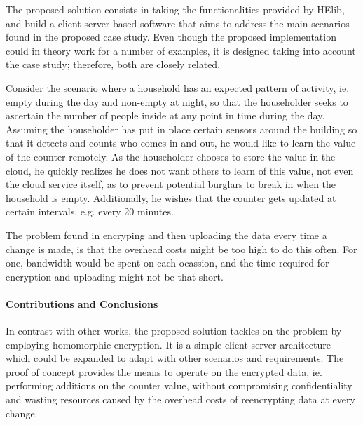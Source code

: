 The proposed solution consists in taking the functionalities provided by HElib, and build a client-server based software that aims to address the main scenarios found in the proposed case study. Even though the proposed implementation could in theory work for a number of examples, it is designed taking into account the case study; therefore, both are closely related.

Consider the scenario where a household has an expected pattern of activity, ie. empty during the day and non-empty at night, so that the householder seeks to ascertain the number of people inside at any point in time during the day. Assuming the householder has put in place certain sensors around the building so that it detects and counts who comes in and out, he would like to learn the value of the counter remotely. As the householder chooses to store the value in the cloud, he quickly realizes he does not want others to learn of this value, not even the cloud service itself, as to prevent potential burglars to break in when the household is empty. Additionally, he wishes that the counter gets updated at certain intervals, e.g. every 20 minutes. 

The problem found in encryping and then uploading the data every time a change is made, is that the overhead costs might be too high to do this often. For one, bandwidth would be spent on each ocassion, and the time required for encryption and uploading might not be that short. 

\paragraph{Contributions and Conclusions}
In contrast with other works, the proposed solution tackles on the problem by employing homomorphic encryption. It is a simple client-server architecture which could be expanded to adapt with other scenarios and requirements. The proof of concept provides the means to operate on the encrypted data, ie. performing additions on the counter value, without compromising confidentiality and wasting resources caused by the overhead costs of reencrypting data at every change.


